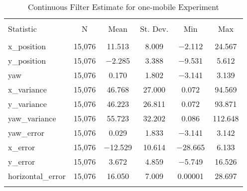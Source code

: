 
\begin{table}[h] \centering 
  \caption{Continuous Filter Estimate for one-mobile Experiment} 
  \label{tab:one_mobile_continuous_summary} 
\begin{tabular}{@{\extracolsep{5pt}}lccccc} 
\\[-1.8ex]\hline 
\hline \\[-1.8ex] 
Statistic & \multicolumn{1}{c}{N} & \multicolumn{1}{c}{Mean} & \multicolumn{1}{c}{St. Dev.} & \multicolumn{1}{c}{Min} & \multicolumn{1}{c}{Max} \\ 
\hline \\[-1.8ex] 
x\_position & 15,076 & 11.513 & 8.009 & $-$2.112 & 24.567 \\ 
y\_position & 15,076 & $-$2.285 & 3.388 & $-$9.531 & 5.612 \\ 
yaw & 15,076 & 0.170 & 1.802 & $-$3.141 & 3.139 \\ 
x\_variance & 15,076 & 46.768 & 27.000 & 0.072 & 94.569 \\ 
y\_variance & 15,076 & 46.223 & 26.811 & 0.072 & 93.871 \\ 
yaw\_variance & 15,076 & 55.723 & 32.202 & 0.086 & 112.648 \\ 
yaw\_error & 15,076 & 0.029 & 1.833 & $-$3.141 & 3.142 \\ 
x\_error & 15,076 & $-$12.529 & 10.614 & $-$28.665 & 6.133 \\ 
y\_error & 15,076 & 3.672 & 4.859 & $-$5.749 & 16.526 \\ 
horizontal\_error & 15,076 & 16.050 & 7.009 & 0.00001 & 28.697 \\ 
\hline \\[-1.8ex] 
\end{tabular} 
\end{table} 
